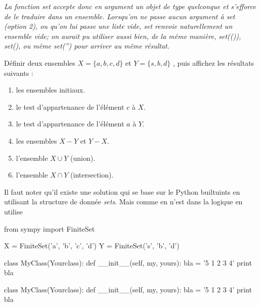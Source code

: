 \documentclass[11pt,fleqn]{book} %
\begin{document}
\textit{La fonction set accepte donc en argument un objet de type quelconque et s'efforce de le traduire dans un ensemble. Lorsqu'on ne passe aucun argument à set (option 2), ou qu'on lui passe une liste vide, set renvoie naturellement un ensemble vide; on aurait pu utiliser aussi bien, de la même manière, set(()), set({}), ou même set('') pour arriver au même résultat.}

	\begin{exercise}
		Définir deux ensembles $X = \lbrace a, b, c, d\rbrace$ et  $Y = \lbrace s, b, d\rbrace$ , puis 			affichez les résultats suivants :
 		\begin{enumerate}
  			 \item les ensembles initiaux.
  			 \item le test d’appartenance de l’élément $c$ à $X$.
  			 \item le test d’appartenance de l’élément $a$ à $Y$.
  			 \item les ensembles $X - Y$ et $Y - X$.
  			 \item l’ensemble $X \cup Y$ (union).
  			 \item l'ensemble $X \cap Y$ (intersection).
	 \end{enumerate}
	\end{exercise}

\begin{solution}
Il faut noter qu'il existe une solution qui se base sur le Python builtuints en utilisant la structure de donnée \textit{sets}. Mais comme en n'est dans la logique en utilise 
\begin{python}
from sympy import FiniteSet

X = FiniteSet('a', 'b', 'c', 'd')
Y = FiniteSet('s', 'b', 'd')

class MyClass(Yourclass):
    def __init__(self, my, yours):
        bla = '5 1 2 3 4'
        print bla
\end{python}
\begin{python}
class MyClass(Yourclass):
    def __init__(self, my, yours):
        bla = '5 1 2 3 4'
        print bla
\end{python}

\end{solution}
\end{document}
